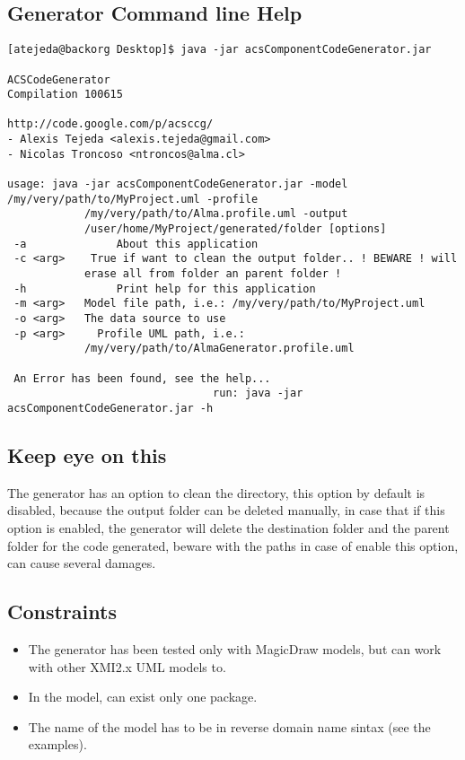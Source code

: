 \subsection {Generator Command line Help} 
\begin{verbatim}
[atejeda@backorg Desktop]$ java -jar acsComponentCodeGenerator.jar 

ACSCodeGenerator
Compilation 100615

http://code.google.com/p/acsccg/
- Alexis Tejeda <alexis.tejeda@gmail.com>
- Nicolas Troncoso <ntroncos@alma.cl>

usage: java -jar acsComponentCodeGenerator.jar -model /my/very/path/to/MyProject.uml -profile
            /my/very/path/to/Alma.profile.uml -output
            /user/home/MyProject/generated/folder [options]
 -a              About this application
 -c <arg>    True if want to clean the output folder.. ! BEWARE ! will
            erase all from folder an parent folder !
 -h              Print help for this application
 -m <arg>   Model file path, i.e.: /my/very/path/to/MyProject.uml
 -o <arg>   The data source to use
 -p <arg>     Profile UML path, i.e.:
            /my/very/path/to/AlmaGenerator.profile.uml

 An Error has been found, see the help...
                                run: java -jar acsComponentCodeGenerator.jar -h

\end{verbatim}

\subsection {Keep eye on this} 
The generator has an option to clean the directory, this option by default is
disabled, because the output folder can be deleted manually, in case that if
this option is enabled, the generator will delete the destination folder and the
parent folder for the code generated, beware with the paths in case of enable
this option, can cause several damages.

\subsection {Constraints} 
\begin{itemize}
  \item The generator has been tested only with MagicDraw models, but can work
  with other XMI2.x UML models to.
  \item In the model, can exist only one package.
  \item The name of the model has to be in reverse domain name sintax (see the
  examples).
\end{itemize}
